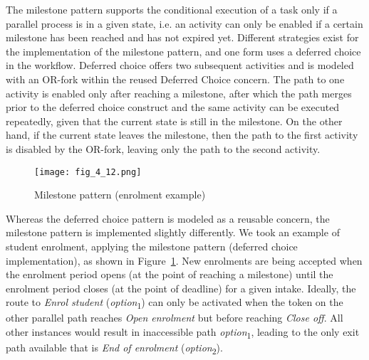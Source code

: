 The milestone pattern supports the conditional execution of a task only if a parallel process is in a given state, i.e. an activity can only be enabled if a certain milestone has been reached and has not expired yet. Different strategies exist for the implementation of the milestone pattern, and one form uses a deferred choice in the workflow. Deferred choice offers two subsequent activities and is modeled with an OR-fork within the reused Deferred Choice concern. The path to one activity is enabled only after reaching a milestone, after which the path merges prior to the deferred choice construct and the same activity can be executed repeatedly, given that the current state is still in the milestone. On the other hand, if the current state leaves the milestone, then the path to the first activity is disabled by the OR-fork, leaving only the path to the second activity.

\begin{figure}
	\centering
	\texttt{[image: fig\_4\_12.png]}
	\caption{Milestone pattern (enrolment example)}
	\label{fig:4.12}
\end{figure}

Whereas the deferred choice pattern is modeled as a reusable concern, the milestone pattern is implemented slightly differently. We took an example of student enrolment, applying the milestone pattern (deferred choice implementation), as shown in Figure~\ref{fig:4.12}. New enrolments are being accepted when the enrolment period opens (at the point of reaching a milestone) until the enrolment period closes (at the point of deadline) for a given intake. Ideally, the route to \emph{Enrol student} (\emph{option}\textsubscript{1}) can only be activated when the token on the other parallel path reaches \emph{Open enrolment} but before reaching \emph{Close off}. All other instances would result in inaccessible path \emph{option}\textsubscript{1}, leading to the only exit path available that is \emph{End of enrolment} (\emph{option}\textsubscript{2}).

